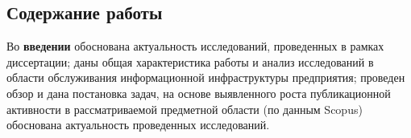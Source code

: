 \subsection*{}

\newcommand{\actuality}{\underline{\textbf{Актуальность темы.}}}
\newcommand{\aim}{{\textbf{Целью}}}
\newcommand{\tasks}{{\textbf{задачи}}}
\newcommand{\scope}{{\textbf{Область исследования}}}
\newcommand{\subject}{{\textbf{Предметом исследования}}}
\newcommand{\methods}{{\textbf{Методы исследования}}}
\newcommand{\defpositions}{{\textbf{Основные положения, выносимые на~защиту:}}}
\newcommand{\novelty}{{\textbf{Научная новизна}}}
\newcommand{\influence}{{\textbf{Практическая значимость.}}}
\newcommand{\reliability}{{\textbf{Достоверность}}}
\newcommand{\probation}{{\textbf{Апробация работы.}}}
\newcommand{\contribution}{{\textbf{Личный вклад.}}}
\newcommand{\publications}{{\textbf{Публикации.}}}




\subsection*{Содержание работы}
Во \textbf{введении} обоснована актуальность исследований, проведенных в рамках диссертации; даны общая характеристика работы и анализ исследований в области обслуживания информационной инфраструктуры предприятия; проведен обзор и дана постановка задач, на основе выявленного роста публикационной активности в рассматриваемой предметной области (по данным Scopus) обоснована актуальность проведенных исследований. \par

